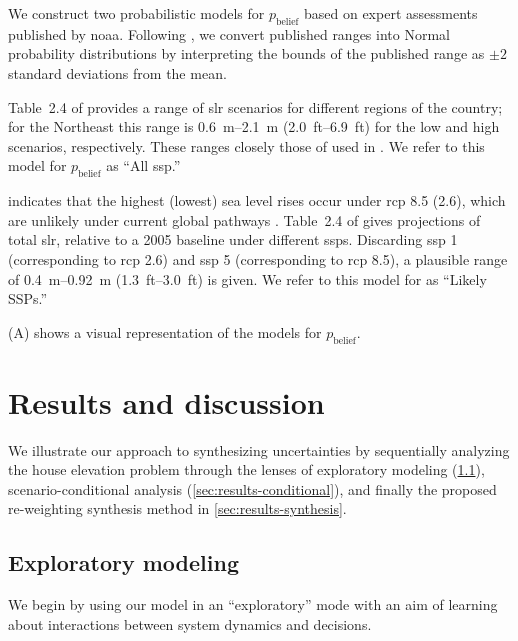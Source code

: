 \documentclass[12pt]{article}
\begin{document}
We construct two probabilistic models for $p_\text{belief}$ based on expert assessments published by \gls{noaa}.
Following \citet{fuller_inversion:2017}, we convert published ranges into Normal probability distributions by interpreting the bounds of the published range as $\pm 2$ standard deviations from the mean.

Table~2.4 of \citet{sweet_slr:2022} provides a range of \gls{slr} scenarios for different regions of the country; for the Northeast this range is \SIrange{0.6}{2.1}{\meter} (\SIrange{2.0}{6.9}{ft}) for the low and high scenarios, respectively. These ranges closely those of \citet{pfeffer_sealevel:2008} used in \citet{fuller_inversion:2017}. We refer to this model for $p_\text{belief}$ as ``All \gls{ssp}.''

 indicates that the highest (lowest) sea level rises occur under \gls{rcp} 8.5 (2.6), which are unlikely under current global pathways \citep{hausfather_scenarios:2020}. Table~2.4 of \citet{sweet_slr:2022} gives projections of total \gls{slr}, relative to a 2005 baseline under different \glspl{ssp}. Discarding \gls{ssp} 1 (corresponding to \gls{rcp} 2.6) and \gls{ssp} 5 (corresponding to \gls{rcp} 8.5), a plausible range of \SIrange{0.4}{0.92}{\meter} (\SIrange{1.3}{3.0}{ft}) is given. We refer to this model for as ``Likely SSPs.''

(A) shows a visual representation of the models for $p_\text{belief}$.

\section{Results and discussion}\label{sec:results}

We illustrate our approach to synthesizing uncertainties by sequentially analyzing the house elevation problem through the lenses of exploratory modeling (\cref{sec:results-exploratory}), scenario-conditional analysis (\cref{sec:results-conditional}), and finally the proposed re-weighting synthesis method in \cref{sec:results-synthesis}.

\subsection{Exploratory modeling}\label{sec:results-exploratory}

We begin by using our model in an ``exploratory'' mode with an aim of learning about interactions between system dynamics and decisions.
\end{document}
